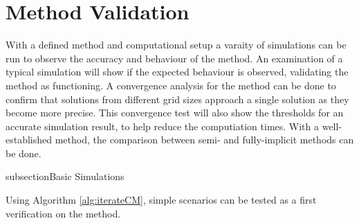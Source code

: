 \section{Method Validation}

  With a defined method and computational setup a varaity of simulations can be run to observe the accuracy and behaviour of the method.
  An examination of a typical simulation will show if the expected behaviour is observed, validating the method as functioning.
  A convergence analysis for the method can be done to confirm that solutions from different grid sizes approach a single solution as they become more precise.
  This convergence test will also show the thresholds for an accurate simulation result, to help reduce the computiation times.
  With a well-established method, the comparison between semi- and fully-implicit methods can be done.

subsection{Basic Simulations}

  Using Algorithm \ref{alg:iterateCM}, simple scenarios can be tested as a first verification on the method.

  

